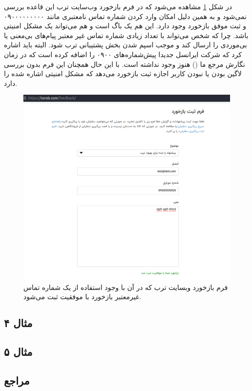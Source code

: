 {در شکل \ref{fig:bug3} مشاهده می‌شود که در فرم بازخورد وب‌سایت ترب این قاعده بررسی نمی‌شود و به همین دلیل امکان وارد کردن شماره تماس نامعتبری مانند ۰۹۰۰۰۰۰۰۰۰۰ و ثبت موفق بازخورد وجود دارد. این هم یک باگ است و هم می‌تواند یک مشکل امنیتی باشد. چرا که شخص می‌تواند با تعداد زیادی شماره تماس غیر معتبر پیام‌های بی‌معنی یا بی‌موردی را ارسال کند و موجب اسپم شدن بخش پشتیبانی ترب شود. البته باید اشاره کرد که شرکت ایرانسل جدیدا پیش‌شماره‌های ۰۹۰۰ را اضافه کرده است که در زمان نگارش مرجع ما (\cite{phoneregex}) هنوز وجود نداشته است. با این حال همچنان این فرم بدون بررسی لاگین بودن یا نبودن کاربر اجازه ثبت بازخورد می‌دهد که مشکل امنیتی اشاره شده را دارد.

\begin{figure}[H]
	\centering
	\includegraphics[width=0.7\linewidth]{figs/bug3}
	\caption[فرم بازخورد وبسایت ترب]{فرم بازخورد وبسایت ترب که در آن با وجود استفاده از یک شماره تماس غیرمعتبر بازخورد با موفقیت ثبت می‌شود.}
	\label{fig:bug3}
\end{figure}


\subsection*{مثال ۴}

\subsection*{مثال ۵}



\subsection*{مراجع}

\begin{latin}
	\begingroup
	\renewcommand{\section}[2]{}%
	

\end{latin}}

